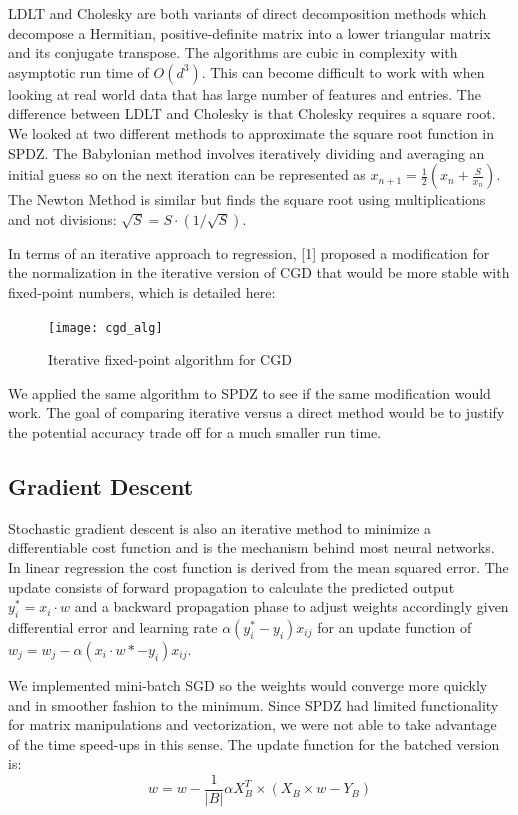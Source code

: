 \documentclass{article}
\begin{document}
LDLT and Cholesky are both variants of direct decomposition methods which decompose a Hermitian, positive-definite matrix into a lower triangular matrix and its conjugate transpose. The algorithms are cubic in complexity with asymptotic run time of $O(d^3)$. This can become difficult to work with when looking at real world data that has large number of features and entries. The difference between LDLT and Cholesky is that Cholesky requires a square root. We looked at two different methods to approximate the square root function in SPDZ. The Babylonian method involves iteratively dividing and averaging an initial guess so on the next iteration can be represented as $x_{n+1} = \frac{1}{2} (x_{n} + \frac{S}{x_{n}})$. The Newton Method is similar but finds the square root using multiplications and not divisions: $\sqrt{S} = S \cdot (1/\sqrt{S})$.

In terms of an iterative approach to regression, [1] proposed a modification for the normalization in the iterative version of CGD that would be more stable with fixed-point numbers, which is detailed here:

\begin{figure}[h]
  \centering
  \texttt{[image: cgd\_alg]}
  \caption{Iterative fixed-point algorithm for CGD}
\end{figure}
We applied the same algorithm to SPDZ to see if the same modification would work. The goal of comparing iterative versus a direct method would be to justify the potential accuracy trade off for a much smaller run time.

\subsection{Gradient Descent}

Stochastic gradient descent is also an iterative method to minimize a differentiable cost function and is the mechanism behind most neural networks. In linear regression the cost function is derived from the mean squared error. The update consists of forward propagation to calculate the predicted output $y_i^* = x_i \cdot w$ and a backward propagation phase to adjust weights accordingly given differential error and learning rate $\alpha(y_i^*-y_i)x_{ij}$ for an update function of $w_j = w_j  - \alpha(x_i \cdot w *-y_i)x_{ij}$.

We implemented mini-batch SGD so the weights would converge more quickly and in smoother fashion to the minimum. Since SPDZ had limited functionality for matrix manipulations and vectorization, we were not able to take advantage of the time speed-ups in this sense. The update function for the batched version is: 
\[
 w = w - \frac{1}{|B|} \alpha X^{T}_{B} \times (X_{B} \times w - Y_{B})
\]
\end{document}
